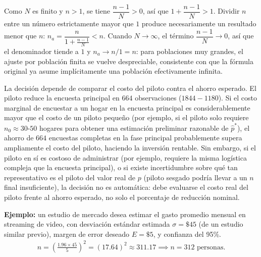 \begin{solproblema}[prob:2e73754]
	Como $N$ es finito y $n>1$, se tiene $\dfrac{n-1}{N}>0$, así que $1+\dfrac{n-1}{N}>1$. Dividir $n$ entre un número estrictamente mayor que $1$ produce necesariamente un resultado menor que $n$: $n_a = \dfrac{n}{1+\frac{n-1}{N}} < n$. Cuando $N\to\infty$, el término $\dfrac{n-1}{N}\to0$, así que el denominador tiende a $1$ y $n_a\to n/1=n$: para poblaciones muy grandes, el ajuste por población finita se vuelve despreciable, consistente con que la fórmula original ya asume implícitamente una población efectivamente infinita.
\end{solproblema}

\begin{solproblema}[prob:d79f0c1]
	La decisión depende de comparar el costo del piloto contra el ahorro esperado. El piloto reduce la encuesta principal en $664$ observaciones ($1844-1180$). Si el costo marginal de encuestar a un hogar en la encuesta principal es considerablemente mayor que el costo de un piloto pequeño (por ejemplo, si el piloto solo requiere $n_0\approx30$-$50$ hogares para obtener una estimación preliminar razonable de $\hat p^*$), el ahorro de $664$ encuestas completas en la fase principal probablemente supera ampliamente el costo del piloto, haciendo la inversión rentable. Sin embargo, si el piloto en sí es costoso de administrar (por ejemplo, requiere la misma logística compleja que la encuesta principal), o si existe incertidumbre sobre qué tan representativo es el piloto del valor real de $p$ (piloto sesgado podría llevar a un $n$ final insuficiente), la decisión no es automática: debe evaluarse el costo real del piloto frente al ahorro esperado, no solo el porcentaje de reducción nominal.
\end{solproblema}

\begin{solproblema}[prob:a691b8d]
	\textbf{Ejemplo:} un estudio de mercado desea estimar el gasto promedio mensual en streaming de video, con desviación estándar estimada $\sigma=\$45$ (de un estudio similar previo), margen de error deseado $E=\$5$, y confianza del 95\%.
	\begin{align*}
		n = \left(\frac{1.96\times45}{5}\right)^2 = (17.64)^2 \approx311.17 \implies n=312\text{ personas}.
	\end{align*}
\end{solproblema}
